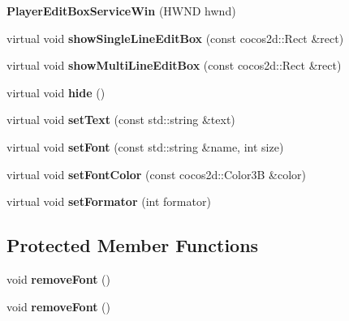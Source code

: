 \begin{DoxyCompactItemize}
{\bfseries Player\+Edit\+Box\+Service\+Win} (H\+W\+ND hwnd)
\item 
\mbox{\label{classPlayerEditBoxServiceWin_ac1513ed61e52c416482a6aac9f3edf0f}} 
virtual void {\bfseries show\+Single\+Line\+Edit\+Box} (const cocos2d\+::\+Rect \&rect)
\item 
\mbox{\label{classPlayerEditBoxServiceWin_a88bd9abbef96fe628477912390769ae1}} 
virtual void {\bfseries show\+Multi\+Line\+Edit\+Box} (const cocos2d\+::\+Rect \&rect)
\item 
\mbox{\label{classPlayerEditBoxServiceWin_ae403d6a42c57139effa1f6c99e98bf7a}} 
virtual void {\bfseries hide} ()
\item 
\mbox{\label{classPlayerEditBoxServiceWin_a1a14316ce222ecc7fd856a3ec24bc273}} 
virtual void {\bfseries set\+Text} (const std\+::string \&text)
\item 
\mbox{\label{classPlayerEditBoxServiceWin_a1e9f4397cf525306a363623ca3069066}} 
virtual void {\bfseries set\+Font} (const std\+::string \&name, int size)
\item 
\mbox{\label{classPlayerEditBoxServiceWin_ac2329ec705c6c93e970721ac7967d39a}} 
virtual void {\bfseries set\+Font\+Color} (const cocos2d\+::\+Color3B \&color)
\item 
\mbox{\label{classPlayerEditBoxServiceWin_a54b36108c832c2b4925602da463937dd}} 
virtual void {\bfseries set\+Formator} (int formator)
\end{DoxyCompactItemize}
\subsection*{Protected Member Functions}
\begin{DoxyCompactItemize}
\item 
\mbox{\label{classPlayerEditBoxServiceWin_aff55594e344565edf3dfb6915aed3795}} 
void {\bfseries remove\+Font} ()
\item 
\mbox{\label{classPlayerEditBoxServiceWin_aff55594e344565edf3dfb6915aed3795}} 
void {\bfseries remove\+Font} ()
\end{DoxyCompactItemize}
